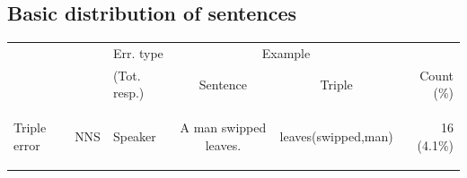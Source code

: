 \subsection{Basic distribution of sentences}
\label{sec:sentence-distribution}

\begin{table}[htb!]
\begin{center}
\setlength{\tabcolsep}{.3em}
\begin{tabular}{|l|l|l|cc|r|}
  \hline
  & & Err. type & \multicolumn{2}{c|}{Example} &  \\
  & & (Tot. resp.) & Sentence & Triple & Count (\%)\\
  \hline
  \hline
  \multirow{8}{*}{\begin{sideways}Triple error\end{sideways}} &
  \multirow{4}{*}{\begin{sideways}NNS\end{sideways}} & Speaker & A man swipped leaves. & leaves(swipped,man) & 16 (4.1\%) \\


\end{tabular}
\end{center}
\end{table}
